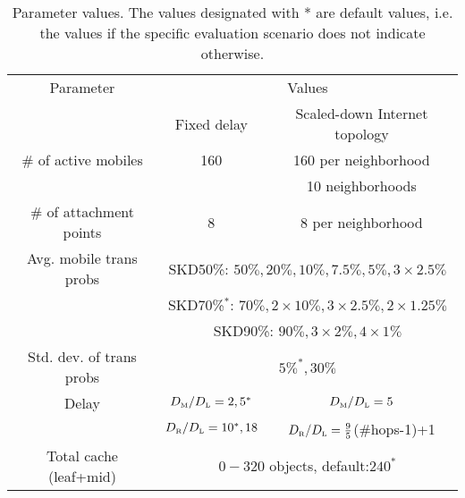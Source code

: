 \documentclass[conference]{IEEEtran}
\newcommand{\mynotex}[1]{}
\newcommand{\M}{\mbox{\tiny M}}
\newcommand{\Leaf}{\mbox{\tiny L}}
\newcommand{\R}{\mbox{\tiny R}}
\begin{document}
\mynotex{\begin{itemize}
\item fixed delay: 10 runs for fixed delay.
\item Internet topology: 10 runs for each neighborhood.
\item each run has duration 10000 handoffs
\item 95\% confidence interval, less than 5\% for all results except 30\% variation of transition probabilities.
\item naive and oracle influences very little by transition probabilities, hence we do not show different results.
\item how long is each run? how many runs do we take for average. conf interval?
\end{itemize}
}

\begin{table}[t]
\caption{Parameter values. The values designated with * are default values, i.e. the values if the specific evaluation scenario does not indicate otherwise.}
    \label{tab:values}
\centering
 {\scriptsize
        \begin{tabular}{|c|c|c|}
        \hline
        Parameter  &  \multicolumn{2}{c|}{Values} \\ \cline{2-3}
                   &  Fixed delay & Scaled-down Internet topology\\
        \hline \hline
   \# of active mobiles      &  160 & 160 per neighborhood \\
                             &      &  10 neighborhoods \\ \hline
   \# of attachment points &  8  & 8 per neighborhood \\ \hline
   Avg. mobile trans probs & \multicolumn{2}{c|}{SKD50\%: $50\%,20\%,10\%,7.5\%,5\%, 3 \times 2.5\%$} \\
     & \multicolumn{2}{c|}{SKD70\%$^*$: $70\%,2 \times 10\%,3 \times 2.5\%,2 \times 1.25\%$} \\
     & \multicolumn{2}{c|}{SKD90\%: $90\%,3 \times 2\%,4 \times 1\%$} \\ \hline
  Std. dev. of trans probs & \multicolumn{2}{c|}{$5\%^*, 30\%$} \\ \hline
  Delay &  $D_{\M}/D_{\Leaf}=2,5^*$  & $D_{\M}/D_{\Leaf}=5$ \\
        & $D_{\R}/D_{\Leaf}=10^*,18$ & $D_{\R}/D_{\Leaf}=\frac{9}{5}$(\#hops-1)+1 \\ \hline
  Total cache (leaf+mid) & \multicolumn{2}{c|}{$0-320$ objects, default:$240^*$} \\
        \hline
        \end{tabular}
        }
\vspace{-0.05in}
\end{table}
\end{document}
